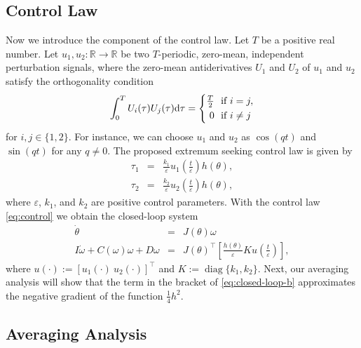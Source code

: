 \documentclass{ifacconf}
\begin{document}
\subsection{Control Law}
Now we introduce the component of the control law. Let $T$ be a positive real number. Let $u_1,u_2:\mathbb{R}\to\mathbb{R}$ be two $T$-periodic, zero-mean, independent perturbation signals, where the zero-mean antiderivatives $U_1$ and $U_2$ of $u_1$ and $u_2$ satisfy the orthogonality condition
\begin{equation}
    \int_0^T U_i(\tau) U_j(\tau) {\rm d}\tau=\left\{\begin{aligned}
        \tfrac{T}{2} & {~~\text{if}~i=j,}\\
         0  & {~~\text{if}~i\neq j}
    \end{aligned}  \right.
\end{equation}
for $i,j\in\{1,2\}$. For instance, we can choose $u_1$ and $u_2$ as $\cos(q t)$ and $\sin(q t)$ for any $q\neq 0$. The proposed extremum seeking control law is given by
\begin{subequations}\label{eq:control}
    \begin{eqnarray}
         \tau_1&=& \frac{k_1}{\varepsilon}u_1\left(\frac{t}{\varepsilon}\right)h(\theta),\\
         \tau_2&=& \frac{k_2}{\varepsilon}u_2\left(\frac{t}{\varepsilon}\right)h(\theta),
    \end{eqnarray}
\end{subequations}
where $\varepsilon$, $k_1$, and $k_2$ are positive control parameters. With the control law \eqref{eq:control} we obtain the closed-loop system
\begin{subequations}
  \label{eq:closed-loop}
  \begin{eqnarray}
     \label{eq:closed-loop-a}  \dot{\theta} &=&J(\theta)\omega \\
     \label{eq:closed-loop-b}  I\dot{\omega}+C(\omega)\omega + D\omega &=& J(\theta)^\top \left[\frac{h(\theta)}{\varepsilon} K u\left(\frac{t}{\varepsilon}\right)\right],  
  \end{eqnarray}
\end{subequations}
where $u(\cdot):=[u_1(\cdot)~u_2(\cdot)]^\top$ and $K:=\operatorname{diag}\{k_1,k_2\}$. Next, our averaging analysis will show that the term in the bracket of \eqref{eq:closed-loop-b} approximates the negative gradient of the function $ \frac{1}{4}h^2 $.

\subsection{Averaging Analysis}
\end{document}
